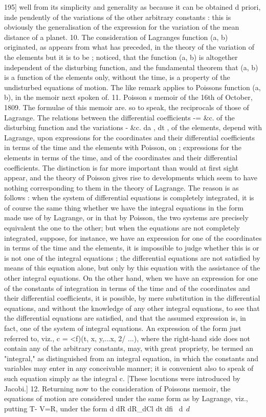 \documentclass[11pt,a4paper]{book}
\begin{document}
195]
well from its simplicity and generality as because it can be obtained d priori, inde
pendently of the variations of the other arbitrary constants : this is obviously the
generalisation of the expression for the variation of the mean distance of a planet.
10. The consideration of Lagranges function (a, b) originated, as appears from
what has preceded, in the theory of the variation of the elements but it is to be
;
noticed, that the function (a, b) is altogether independent of the disturbing function,
and the fundamental theorem that (a, b) is a function of the elements only, without
the time, is a property of the undisturbed equations of motion. The like remark applies
to Poissons function (a, b), in the memoir next spoken of.
11. Poisson s memoir of the 16th of October, 1809. The formulae of this memoir
are. so to speak, the reciprocals of those of Lagrange. The relations between the
differential coefficients -= &c. of the disturbing function and the variations - &c.
da , dt ,
of the elements, depend with Lagrange, upon expressions for the coordinates and their
differential coefficients in terms of the time and the elements with Poisson, on
;
expressions for the elements in terms of the time, and of the coordinates and their
differential coefficients. The distinction is far more important than would at first sight
appear, and the theory of Poisson gives rise to developments which seem to have
nothing corresponding to them in the theory of Lagrange. The reason is as follows :
when the system of differential equations is completely integrated, it is of course the
same thing whether we have the integral equations in the form made use of by
Lagrange, or in that by Poisson, the two systems are precisely equivalent the one to
the other; but when the equations are not completely integrated, suppose, for instance,
we have an expression for one of the coordinates in terms of the time and the elements,
it is impossible to judge whether this is or is not one of the integral equations ;
the differential equations are not satisfied by means of this equation alone, but only
by this equation with the assistance of the other integral equations. On the other
hand, when we have an expression for one of the constants of integration in terms
of the time and of the coordinates and their differential coefficients, it is possible, by
mere substitution in the differential equations, and without the knowledge of any other
integral equations, to see that the differential equations are satisfied, and that the
assumed expression is, in fact, one of the system of integral equations. An expression
of the form just referred to, viz., c = <f)(t, x, y,...x, 2/ ...), where the right-hand side
does not contain any of the arbitrary constants, may, with great propriety, be termed
an "integral," as distinguished from an integral equation, in which the constants and
variables may enter in any conceivable manner; it is convenient also to speak of
such equation simply as the integral c. [These locutions were introduced by Jacobi.]
12. Returning now to the consideration of Poissons memoir, the equations of
motion are considered under the same form as by Lagrange, viz., putting T- V=R,
under the form
d dR dR_dCl
dt dfi ~d$~~d$
\end{document}
